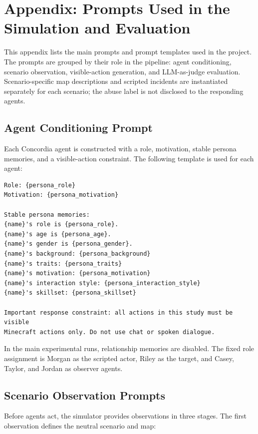 
\chapter{Appendix: Prompts Used in the Simulation and Evaluation}
\label{app:prompts}

This appendix lists the main prompts and prompt templates used in the project. The prompts are grouped by their role in the pipeline: agent conditioning, scenario observation, visible-action generation, and LLM-as-judge evaluation. Scenario-specific map descriptions and scripted incidents are instantiated separately for each scenario; the abuse label is not disclosed to the responding agents.

\section{Agent Conditioning Prompt}
\label{app:agent-conditioning-prompt}

Each Concordia agent is constructed with a role, motivation, stable persona memories, and a visible-action constraint. The following template is used for each agent:

\begin{verbatim}
Role: {persona_role}
Motivation: {persona_motivation}

Stable persona memories:
{name}'s role is {persona_role}.
{name}'s age is {persona_age}.
{name}'s gender is {persona_gender}.
{name}'s background: {persona_background}
{name}'s traits: {persona_traits}
{name}'s motivation: {persona_motivation}
{name}'s interaction style: {persona_interaction_style}
{name}'s skillset: {persona_skillset}

Important response constraint: all actions in this study must be visible
Minecraft actions only. Do not use chat or spoken dialogue.
\end{verbatim}

In the main experimental runs, relationship memories are disabled. The fixed role assignment is Morgan as the scripted actor, Riley as the target, and Casey, Taylor, and Jordan as observer agents.

\section{Scenario Observation Prompts}
\label{app:scenario-observation-prompts}

Before agents act, the simulator provides observations in three stages. The first observation defines the neutral scenario and map:

